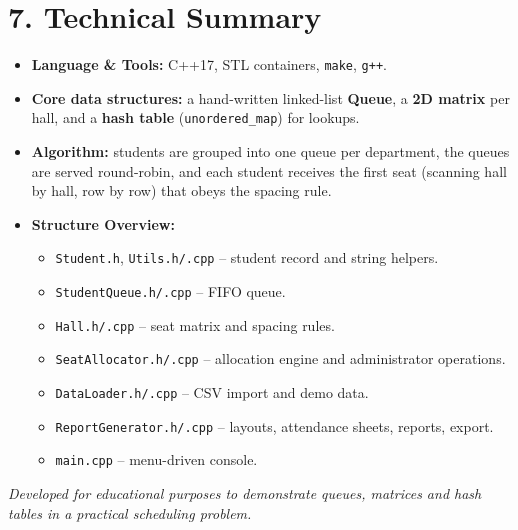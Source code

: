 \documentclass[a4paper,12pt]{article}
\begin{document}
\section*{7. Technical Summary}
\begin{itemize}
    \item \textbf{Language \& Tools:} C++17, STL containers, \texttt{make}, \texttt{g++}.
    \item \textbf{Core data structures:} a hand-written linked-list \textbf{Queue}, a \textbf{2D matrix} per hall, and a \textbf{hash table} (\texttt{unordered\_map}) for lookups.
    \item \textbf{Algorithm:} students are grouped into one queue per department, the queues are served round-robin, and each student receives the first seat (scanning hall by hall, row by row) that obeys the spacing rule.
    \item \textbf{Structure Overview:}
    \begin{itemize}
        \item \texttt{Student.h}, \texttt{Utils.h/.cpp} -- student record and string helpers.
        \item \texttt{StudentQueue.h/.cpp} -- FIFO queue.
        \item \texttt{Hall.h/.cpp} -- seat matrix and spacing rules.
        \item \texttt{SeatAllocator.h/.cpp} -- allocation engine and administrator operations.
        \item \texttt{DataLoader.h/.cpp} -- CSV import and demo data.
        \item \texttt{ReportGenerator.h/.cpp} -- layouts, attendance sheets, reports, export.
        \item \texttt{main.cpp} -- menu-driven console.
    \end{itemize}
\end{itemize}

\vfill
\noindent\textit{Developed for educational purposes to demonstrate queues, matrices and hash tables in a practical scheduling problem.}
\end{document}
